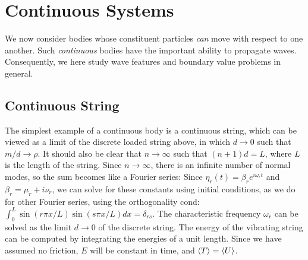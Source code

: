 \newpage
\section{Continuous Systems}
\label{sec:cm-continuous}
We now consider bodies whose constituent particles \textit{can} move with respect to one another. Such \textit{continuous} bodies have the important ability to propagate waves. Consequently, we here study wave features and boundary value problems in general.

\subsection{Continuous String}
The simplest example of a continuous body is a continuous string, which can be viewed as a limit of the discrete loaded string above, in which $d \to 0$ such that $m/d \to \rho$. It should also be clear that $n \to \infty$ such that $(n+1)d=L$, where $L$ is the length of the string. Since $n\to\infty$, there is an infinite number of normal modes, so the sum becomes like a Fourier series:
Since $\eta_r(t)=\beta_r e^{i\omega_r t}$ and $\beta_r = \mu_r + i\nu_r$, we can solve for these constants using initial conditions, as we do for other Fourier series, using the orthogonality cond: $\int_0^L\sin(r\pi x/L)\sin(s\pi x/L)dx=\delta_{rs}$. The characteristic frequency $\omega_r$ can be solved as the limit $d\to 0$ of the discrete string.
The energy of the vibrating string can be computed by integrating the energies of a unit length. Since we have assumed no friction, $E$ will be constant in time, and $\langle T\rangle=\langle U\rangle$.
